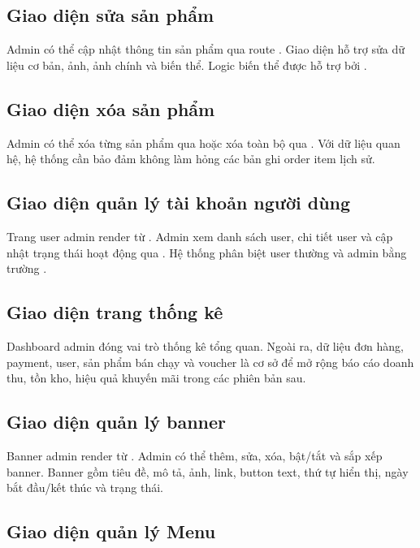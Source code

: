 \documentclass[12pt,a4paper]{report}
\begin{document}
\subsection{Giao diện sửa sản phẩm}

Admin có thể cập nhật thông tin sản phẩm qua route . Giao diện hỗ trợ sửa dữ liệu cơ bản, ảnh, ảnh chính và biến thể. Logic biến thể được hỗ trợ bởi .

\subsection{Giao diện xóa sản phẩm}

Admin có thể xóa từng sản phẩm qua  hoặc xóa toàn bộ qua . Với dữ liệu quan hệ, hệ thống cần bảo đảm không làm hỏng các bản ghi order item lịch sử.

\subsection{Giao diện quản lý tài khoản người dùng}

Trang user admin render từ . Admin xem danh sách user, chi tiết user và cập nhật trạng thái hoạt động qua . Hệ thống phân biệt user thường và admin bằng trường .

\subsection{Giao diện trang thống kê}

Dashboard admin đóng vai trò thống kê tổng quan. Ngoài ra, dữ liệu đơn hàng, payment, user, sản phẩm bán chạy và voucher là cơ sở để mở rộng báo cáo doanh thu, tồn kho, hiệu quả khuyến mãi trong các phiên bản sau.

\subsection{Giao diện quản lý banner}

Banner admin render từ . Admin có thể thêm, sửa, xóa, bật/tắt và sắp xếp banner. Banner gồm tiêu đề, mô tả, ảnh, link, button text, thứ tự hiển thị, ngày bắt đầu/kết thúc và trạng thái.

\subsection{Giao diện quản lý Menu}
\end{document}

